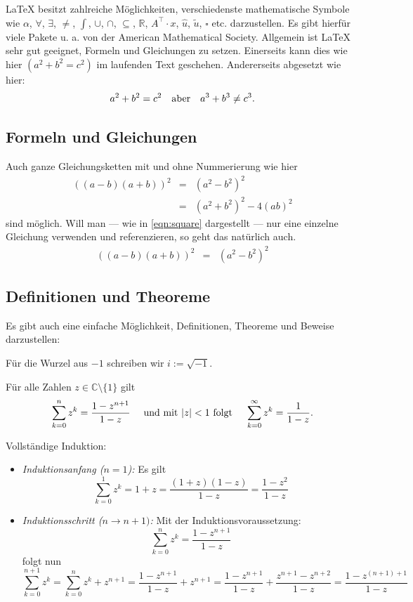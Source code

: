 \documentclass[10pt]{report}
\begin{document}
\LaTeX{} besitzt zahlreiche M\"oglichkeiten, verschiedenste mathematische Symbole wie 
$\alpha$, $\forall$, $\exists$, $\neq$, $\int$, $\cup$, $\cap$, $\subseteq$, $\mathbb{R}$, $A^\top\cdot x$, $\hat{u}$, $\tilde{u}$, \ensuremath{\square} etc. darzustellen. Es gibt hierf\"ur viele Pakete u. a. von der American Mathematical Society. Allgemein ist \LaTeX{} sehr gut geeignet, Formeln und Gleichungen zu setzen. 
Einerseits kann dies wie hier $(a^2+b^2=c^2)$ im laufenden Text geschehen. Andererseits abgesetzt wie hier:
\[a^2+b^2=c^2\quad\hbox{aber}\quad a^3+b^3 \ne c^3 .\]

\subsection{Formeln und Gleichungen}

Auch ganze Gleichungsketten mit und ohne Nummerierung wie hier
\begin{eqnarray*}
  ((a-b)(a+b))^2 &=& (a^2-b^2)^2\\
                 &=& (a^2+b^2)^2-4(ab)^2
\end{eqnarray*}
sind m\"oglich. Will man --- wie in \ref{eqn:square} dargestellt --- nur eine einzelne Gleichung verwenden und referenzieren, so geht das nat\"urlich auch.
\begin{eqnarray} \label{eqn:square}
  ((a-b)(a+b))^2 &=& (a^2-b^2)^2
\end{eqnarray}

\subsection{Definitionen und Theoreme}

Es gibt auch eine einfache M\"oglichkeit, Definitionen, Theoreme und Beweise darzustellen:
\begin{Definition}
F\"ur die Wurzel aus $-1$ schreiben wir $i := \sqrt{-1}$.
\end{Definition}
\begin{Theorem}
F\"ur alle Zahlen $z\in\mathbb{C}\setminus\{1\}$ gilt 
\[
\sum_{k=0}^n z^k = \frac{1-z^{n+1}}{1-z} \quad\hbox{ und mit $|z|<1$ folgt }\quad \sum_{k=0}^\infty z^k = \frac{1}{1-z}. 
\]
\end{Theorem}
\begin{Beweis}
Vollst\"andige Induktion:
\begin{itemize}
\item \emph{Induktionsanfang ($n=1$):} Es gilt  
\[
\sum_{k=0}^1 z^k = 1+z = \frac{(1+z)(1-z)}{1-z} = \frac{1-z^2}{1-z}
\]
\item \emph{Induktionsschritt ($n \rightarrow n+1)$:}
Mit der Induktionsvoraussetzung:
\[
\sum_{k=0}^n z^k = \frac{1-z^{n+1}}{1-z}
\]
folgt nun
\[
\sum_{k=0}^{n+1} z^k 
= \sum_{k=0}^n z^k + z^{n+1} 
= \frac{1-z^{n+1}}{1-z} + z^{n+1} 
= \frac{1-z^{n+1}}{1-z} + \frac{z^{n+1}-z^{n+2}}{1-z} 
= \frac{1-z^{(n+1)+1}}{1-z}
\]
\end{itemize}
\end{Beweis}
\end{document}
